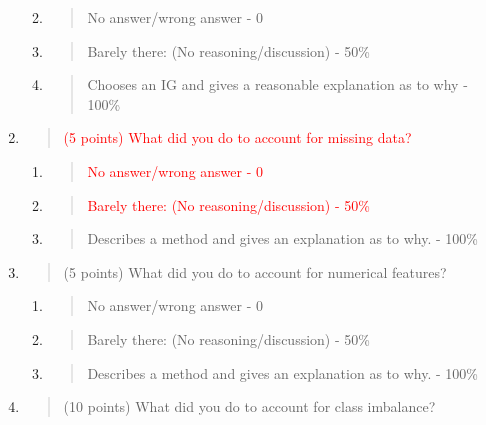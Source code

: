 \documentclass[
]{article}
\begin{document}
\begin{enumerate}
  \begin{enumerate}
  \def\labelenumii{\alph{enumii}.}
  \item
    \begin{quote}
    No answer/wrong answer - 0
    \end{quote}
  \item
    \begin{quote}
    Barely there: (No reasoning/discussion) - 50\%
    \end{quote}
  \item
    \begin{quote}
    Chooses an IG and gives a reasonable explanation as to why - 100\%
    \end{quote}
  \end{enumerate}
\item
  \begin{quote}
  \textcolor{red}{(5 points) What did you do to account for missing data?}
  \end{quote}

  \begin{enumerate}
  \def\labelenumii{\alph{enumii}.}
  \item
    \begin{quote}
    \textcolor{red}{No answer/wrong answer - 0}
    \end{quote}
  \item
    \begin{quote}
    \textcolor{red}{Barely there: (No reasoning/discussion) - 50\%}
    \end{quote}
  \item
    \begin{quote}
    Describes a method and gives an explanation as to why. - 100\%
    \end{quote}
  \end{enumerate}
\item
  \begin{quote}
  (5 points) What did you do to account for numerical features?
  \end{quote}

  \begin{enumerate}
  \def\labelenumii{\alph{enumii}.}
  \item
    \begin{quote}
    No answer/wrong answer - 0
    \end{quote}
  \item
    \begin{quote}
    Barely there: (No reasoning/discussion) - 50\%
    \end{quote}
  \item
    \begin{quote}
    Describes a method and gives an explanation as to why. - 100\%
    \end{quote}
  \end{enumerate}
\item
  \begin{quote}
  (10 points) What did you do to account for class imbalance?
  \end{quote}


\end{enumerate}
\end{document}
